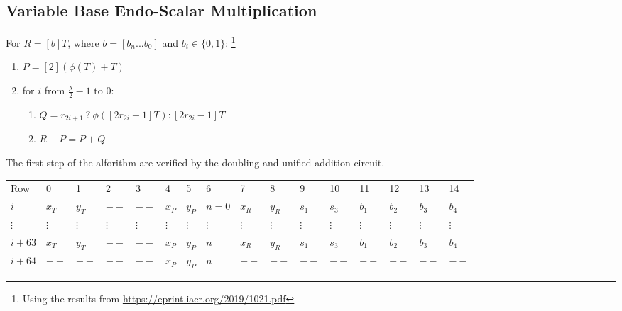 \subsection{Variable Base Endo-Scalar Multiplication}

For $R  = [b]T$, where $b = [b_n ... b_0]$ and $b_i \in \{0, 1\}$:
 \footnote{Using the results from \url{https://eprint.iacr.org/2019/1021.pdf}}
\begin{enumerate}
    \item $P = [2](\phi(T) + T)$
    \item for $i$ from $\frac{\lambda}{2} - 1$ to $0$:
    \begin{enumerate}
        \item $Q = r_{2i + 1} \: ? \: \phi([2r_{2i} - 1]T) : [2r_{2i} - 1]T$
        \item $R - P = P + Q$
    \end{enumerate}
\end{enumerate}
The first step of the alforithm are verified by the doubling and unified addition circuit. 

\begin{center}
    \begin{table}[H]
        \begin{tabular}{llllllllllllllll}
            Row    & 0        & 1        & 2        & 3        & 4        & 5        & 6        & 7        & 8        & 9        & 10       & 11       & 12       & 13       & 14       \\
            $i$   & $x_T$    & $y_T$    & $--$    & $--$    & $x_P$    & $y_P$    & $n = 0$      & $x_R$    & $y_R$    & $s_1$    & $s_3$    & $b_1$    & $b_2$ & $b_3$ & $b_4$ \\
            $\vdots$ & $\vdots$ & $\vdots$ & $\vdots$ & $\vdots$ & $\vdots$ & $\vdots$ & $\vdots$ & $\vdots$ & $\vdots$ & $\vdots$ & $\vdots$ & $\vdots$ & $\vdots$ & $\vdots$ & $\vdots$ \\
            $i + 63$ &  $x_T$    & $y_T$    & $--$    & $--$    & $x_P$    & $y_P$    & $n$      & $x_R$    & $y_R$    & $s_1$    & $s_3$    & $b_1$    & $b_2$ & $b_3$ & $b_4$ \\
            $i + 64$ &  $--$    & $--$    & $--$    & $--$    & $x_P$    & $y_P$    & $n$      & $--$    & $--$    & $--$    & $--$    & $--$    & $--$ & $--$ & $--$ \\
        \end{tabular}
    \end{table}
\end{center}

